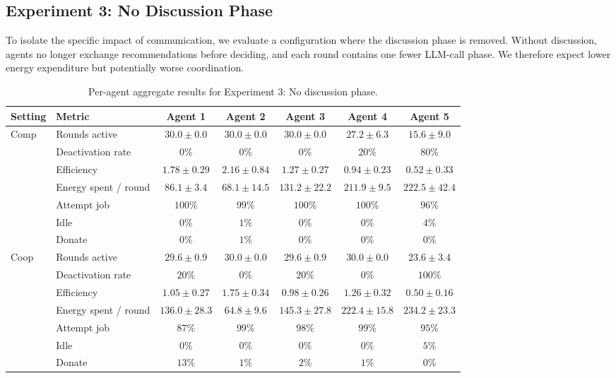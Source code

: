 \documentclass[sigconf,nonacm]{acmart}
\begin{document}
\subsection{Experiment 3: No Discussion Phase}
To isolate the specific impact of communication, we evaluate a configuration where the discussion phase is removed.
Without discussion, agents no longer exchange recommendations before deciding, and each round contains one fewer LLM-call phase.
We therefore expect lower energy expenditure but potentially worse coordination.

\begin{table}[htp]
\centering
\small
\setlength{\tabcolsep}{4pt}
\begin{tabular}{llccccc}
\toprule
Setting & Metric & Agent 1 & Agent 2 & Agent 3 & Agent 4 & Agent 5 \\
\midrule
\multirow{7}{*}{Comp}
& Rounds active
& $30.0 \pm 0.0$ & $30.0 \pm 0.0$ & $30.0 \pm 0.0$ & $27.2 \pm 6.3$ & $15.6 \pm 9.0$ \\
& Deactivation rate
& $0\%$ & $0\%$ & $0\%$ & $20\%$ & $80\%$ \\
& Efficiency
& $1.78 \pm 0.29$ & $2.16 \pm 0.84$ & $1.27 \pm 0.27$ & $0.94 \pm 0.23$ & $0.52 \pm 0.33$ \\
& Energy spent / round
& $86.1 \pm 3.4$ & $68.1 \pm 14.5$ & $131.2 \pm 22.2$ & $211.9 \pm 9.5$ & $222.5 \pm 42.4$ \\
& Attempt job
& $100\%$ & $99\%$ & $100\%$ & $100\%$ & $96\%$ \\
& Idle
& $0\%$ & $1\%$ & $0\%$ & $0\%$ & $4\%$ \\
& Donate
& $0\%$ & $1\%$ & $0\%$ & $0\%$ & $0\%$ \\
\midrule
\multirow{7}{*}{Coop}
& Rounds active
& $29.6 \pm 0.9$ & $30.0 \pm 0.0$ & $29.6 \pm 0.9$ & $30.0 \pm 0.0$ & $23.6 \pm 3.4$ \\
& Deactivation rate
& $20\%$ & $0\%$ & $20\%$ & $0\%$ & $100\%$ \\
& Efficiency
& $1.05 \pm 0.27$ & $1.75 \pm 0.34$ & $0.98 \pm 0.26$ & $1.26 \pm 0.32$ & $0.50 \pm 0.16$ \\
& Energy spent / round
& $136.0 \pm 28.3$ & $64.8 \pm 9.6$ & $145.3 \pm 27.8$ & $222.4 \pm 15.8$ & $234.2 \pm 23.3$ \\
& Attempt job
& $87\%$ & $99\%$ & $98\%$ & $99\%$ & $95\%$ \\
& Idle
& $0\%$ & $0\%$ & $0\%$ & $0\%$ & $5\%$ \\
& Donate
& $13\%$ & $1\%$ & $2\%$ & $1\%$ & $0\%$ \\
\bottomrule
\end{tabular}
\caption{Per-agent aggregate results for Experiment 3: No discussion phase.}
\label{tab:exp3_big_table}
\end{table}
\end{document}
